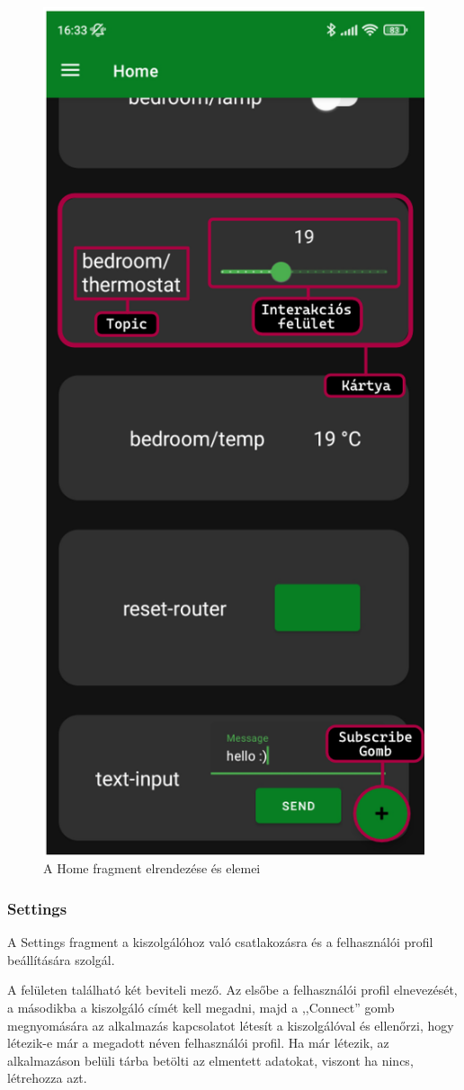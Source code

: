 \documentclass[]{thesis-ekf}
\theoremstyle{definition}
\theoremstyle{remark}
\begin{document}
\begin{figure}[ht]
	\centering
	\includegraphics[width=0.5\linewidth]{images/home_anatomy.png}
	\caption{A Home fragment elrendezése és elemei}
	\label{fig_home_anatomy}
\end{figure}
	
\subsubsection{Settings}
A Settings fragment a kiszolgálóhoz való csatlakozásra és a felhasználói profil beállítására szolgál.

A felületen található két beviteli mező. Az elsőbe a felhasználói profil elnevezését, a másodikba a kiszolgáló címét
kell megadni, majd a ,,Connect'' gomb megnyomására az alkalmazás  kapcsolatot létesít a kiszolgálóval és ellenőrzi, hogy
létezik-e már a megadott néven felhasználói profil. Ha már létezik, az alkalmazáson belüli tárba betölti az elmentett adatokat,
viszont ha nincs, létrehozza azt.
\end{document}
